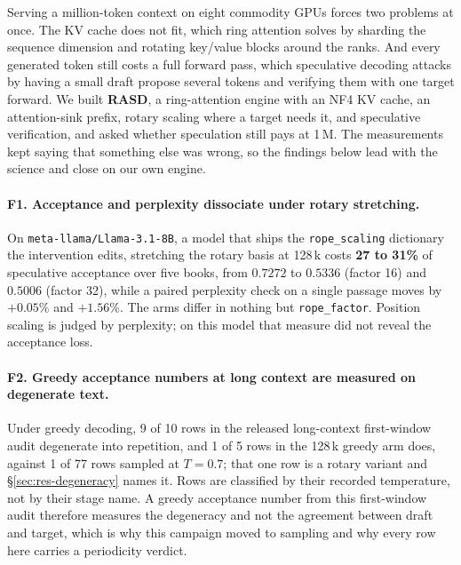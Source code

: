 \documentclass{article}
\begin{document}
Serving a million-token context on eight commodity GPUs forces two problems at once. The KV
cache does not fit, which ring attention \citep{liu2023ringattention} solves by sharding the
sequence dimension and rotating key/value blocks around the ranks. And every generated token
still costs a full forward pass, which speculative decoding
\citep{leviathan2023fast,chen2023accelerating} attacks by having a small draft propose several
tokens and verifying them with one target forward. We built \textbf{RASD}, a ring-attention
engine with an NF4 KV cache, an attention-sink prefix, rotary scaling where a target needs it,
and speculative verification, and asked whether speculation still pays at 1\,M. The
measurements kept saying that something else was wrong, so the findings below lead with the
science and close on our own engine.

\paragraph{F1. Acceptance and perplexity dissociate under rotary stretching.}
On \texttt{meta-llama/Llama-3.1-8B}, a model that ships the \texttt{rope\_scaling} dictionary
the intervention edits, stretching the rotary basis at 128\,k costs \textbf{27 to 31\%} of
speculative acceptance over five books, from $0.7272$ to $0.5336$ (factor 16) and $0.5006$
(factor 32), while a paired perplexity check on a single passage moves by $+0.05\%$ and
$+1.56\%$. The arms differ in nothing but \texttt{rope\_factor}. Position scaling is judged by
perplexity; on this model that measure did not reveal the acceptance loss.

\paragraph{F2. Greedy acceptance numbers at long context are measured on degenerate text.}
Under greedy decoding, 9 of 10 rows in the released long-context first-window audit degenerate
into repetition, and 1 of 5 rows in the 128\,k greedy arm does, against 1 of 77 rows sampled
at $T{=}0.7$; that one row is a rotary variant and \S\ref{sec:res-degeneracy} names it. Rows
are classified by their recorded temperature, not by their stage name. A greedy acceptance
number from this first-window audit therefore measures the degeneracy and not the agreement
between draft and target, which
is why this campaign moved to sampling and why every row here carries a periodicity verdict.
\end{document}
